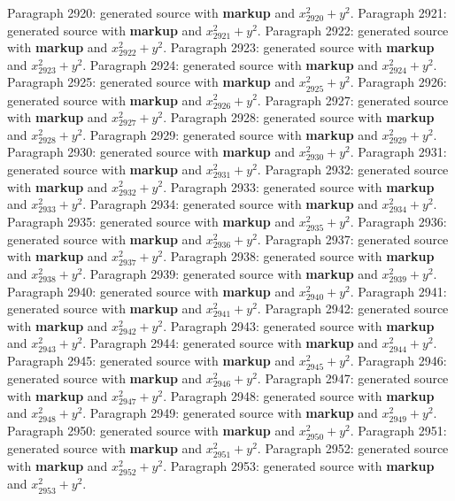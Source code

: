 \documentclass{article}
\begin{document}
Paragraph 2920: generated source with \textbf{markup} and $x_{2920}^2 + y^2$.
Paragraph 2921: generated source with \textbf{markup} and $x_{2921}^2 + y^2$.
Paragraph 2922: generated source with \textbf{markup} and $x_{2922}^2 + y^2$.
Paragraph 2923: generated source with \textbf{markup} and $x_{2923}^2 + y^2$.
Paragraph 2924: generated source with \textbf{markup} and $x_{2924}^2 + y^2$.
Paragraph 2925: generated source with \textbf{markup} and $x_{2925}^2 + y^2$.
Paragraph 2926: generated source with \textbf{markup} and $x_{2926}^2 + y^2$.
Paragraph 2927: generated source with \textbf{markup} and $x_{2927}^2 + y^2$.
Paragraph 2928: generated source with \textbf{markup} and $x_{2928}^2 + y^2$.
Paragraph 2929: generated source with \textbf{markup} and $x_{2929}^2 + y^2$.
Paragraph 2930: generated source with \textbf{markup} and $x_{2930}^2 + y^2$.
Paragraph 2931: generated source with \textbf{markup} and $x_{2931}^2 + y^2$.
Paragraph 2932: generated source with \textbf{markup} and $x_{2932}^2 + y^2$.
Paragraph 2933: generated source with \textbf{markup} and $x_{2933}^2 + y^2$.
Paragraph 2934: generated source with \textbf{markup} and $x_{2934}^2 + y^2$.
Paragraph 2935: generated source with \textbf{markup} and $x_{2935}^2 + y^2$.
Paragraph 2936: generated source with \textbf{markup} and $x_{2936}^2 + y^2$.
Paragraph 2937: generated source with \textbf{markup} and $x_{2937}^2 + y^2$.
Paragraph 2938: generated source with \textbf{markup} and $x_{2938}^2 + y^2$.
Paragraph 2939: generated source with \textbf{markup} and $x_{2939}^2 + y^2$.
Paragraph 2940: generated source with \textbf{markup} and $x_{2940}^2 + y^2$.
Paragraph 2941: generated source with \textbf{markup} and $x_{2941}^2 + y^2$.
Paragraph 2942: generated source with \textbf{markup} and $x_{2942}^2 + y^2$.
Paragraph 2943: generated source with \textbf{markup} and $x_{2943}^2 + y^2$.
Paragraph 2944: generated source with \textbf{markup} and $x_{2944}^2 + y^2$.
Paragraph 2945: generated source with \textbf{markup} and $x_{2945}^2 + y^2$.
Paragraph 2946: generated source with \textbf{markup} and $x_{2946}^2 + y^2$.
Paragraph 2947: generated source with \textbf{markup} and $x_{2947}^2 + y^2$.
Paragraph 2948: generated source with \textbf{markup} and $x_{2948}^2 + y^2$.
Paragraph 2949: generated source with \textbf{markup} and $x_{2949}^2 + y^2$.
Paragraph 2950: generated source with \textbf{markup} and $x_{2950}^2 + y^2$.
Paragraph 2951: generated source with \textbf{markup} and $x_{2951}^2 + y^2$.
Paragraph 2952: generated source with \textbf{markup} and $x_{2952}^2 + y^2$.
Paragraph 2953: generated source with \textbf{markup} and $x_{2953}^2 + y^2$.
\end{document}
